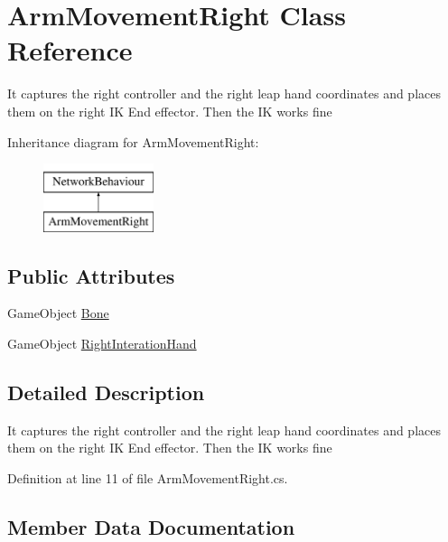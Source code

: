 \hypertarget{class_arm_movement_right}{}\section{Arm\+Movement\+Right Class Reference}
\label{class_arm_movement_right}


It captures the right controller and the right leap hand coordinates and places them on the right IK End effector. Then the IK works fine  


Inheritance diagram for Arm\+Movement\+Right\+:\begin{figure}[H]
\begin{center}
\leavevmode
\includegraphics[height=2.000000cm]{class_arm_movement_right}
\end{center}
\end{figure}
\subsection*{Public Attributes}
\begin{DoxyCompactItemize}
\item 
Game\+Object \mbox{\hyperlink{class_arm_movement_right_a144a6f8bbec3c306cda478ad5f6f3421}{Bone}}
\item 
Game\+Object \mbox{\hyperlink{class_arm_movement_right_a2e301e71f3e754ca1806fbf6a7e62545}{Right\+Interation\+Hand}}
\end{DoxyCompactItemize}


\subsection{Detailed Description}
It captures the right controller and the right leap hand coordinates and places them on the right IK End effector. Then the IK works fine 



Definition at line 11 of file Arm\+Movement\+Right.\+cs.



\subsection{Member Data Documentation}
\mbox{\label{class_arm_movement_right_a144a6f8bbec3c306cda478ad5f6f3421}} 
